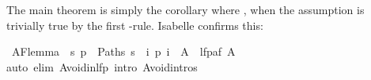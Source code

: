 \begin{isabellebody}
\begin{isamarkuptext}
\begin{isabelle}
\end{isabelle}
The main theorem is simply the corollary where ,
when the assumption  is trivially true
by the first -rule. Isabelle confirms this:%
%
\end{isamarkuptext}%
\isamarkuptrue%
\isamarkupfalse%
\ AF{}lemma{}{}\ \ {}{}s{}\ {}p\ {}\ Paths\ s{}\ {}\ i{}\ p\ i\ {}\ A{}\ {}\ lfp{}af\ A{}{}\isanewline
%
\isadelimproof
%
\endisadelimproof
%
\isatagproof
{}\isamarkupfalse%
{}auto\ elim{}\ Avoid{}in{}lfp\ intro{}\ Avoid{}intros{}\isanewline
\isanewline
%
\endisatagproof
{\isafoldproof}%
%
\isadelimproof
%
\endisadelimproof
%
\isadelimtheory
%
\endisadelimtheory
%
\isatagtheory
%
\endisatagtheory
{\isafoldtheory}%
%
\isadelimtheory
%
\endisadelimtheory
\end{isabellebody}%
